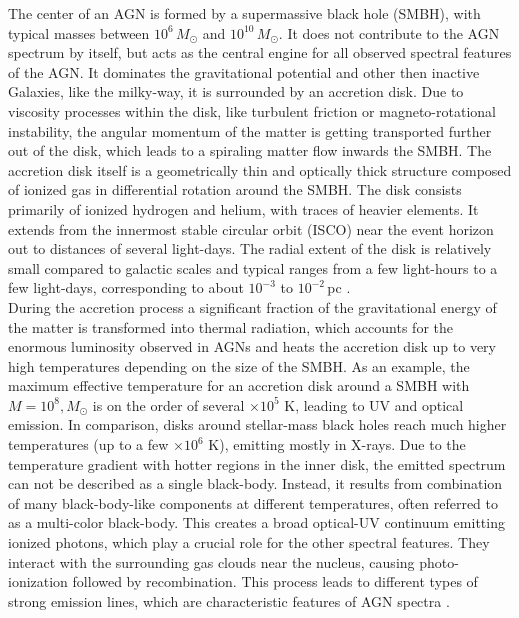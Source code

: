 The center of an AGN is formed by a supermassive black hole (SMBH), with typical masses between $10^6\,M_\odot$ and $10^{10}\,M_\odot$. It does not contribute to the AGN spectrum by itself, but acts as the central engine for all observed spectral features of the AGN. It dominates the gravitational potential and other then inactive Galaxies, like the milky-way, it is surrounded by an accretion disk. Due to viscosity processes within the disk, like turbulent friction or magneto-rotational instability, the angular momentum of the matter is getting transported further out of the disk, which leads to a spiraling matter flow inwards the SMBH. 
The accretion disk itself is a geometrically thin and optically thick structure composed of ionized gas in differential rotation around the SMBH. The disk consists primarily of ionized hydrogen and helium, with traces of heavier elements. It extends from the innermost stable circular orbit (ISCO) near the event horizon out to distances of several light-days. The radial extent of the disk is relatively small compared to  galactic scales and typical ranges from a few light-hours to a few light-days, corresponding to about $10^{-3}$ to $10^{-2}$\,pc \parencite{netzer2013agn,hickox2018obscured, shakura1973black}.  \\
During the accretion process a significant fraction of the gravitational energy of the matter is transformed into thermal radiation, which accounts for the enormous luminosity observed in AGNs and heats the accretion disk up to very high temperatures depending on the size of the SMBH. As an example, the maximum effective temperature for an accretion disk around a SMBH with $M = 10^8,M_\odot$ is on the order of several $\times 10^5$ K, leading to UV and optical emission. In comparison, disks around stellar-mass black holes reach much higher temperatures (up to a few $\times 10^6$ K), emitting mostly in X-rays. Due to the temperature gradient with hotter regions in the inner disk, the emitted spectrum can not be described as a single black-body. Instead, it results from combination of many black-body-like components at different temperatures, often referred to as a multi-color black-body. This creates a broad optical-UV continuum emitting ionized photons, which play a crucial role for the other spectral features. They interact with the surrounding gas clouds near the nucleus, causing photo-ionization followed by recombination. This process leads to different types of strong emission lines, which are characteristic features of AGN spectra \parencite{netzer2013agn, osterbrock1989agn}.


